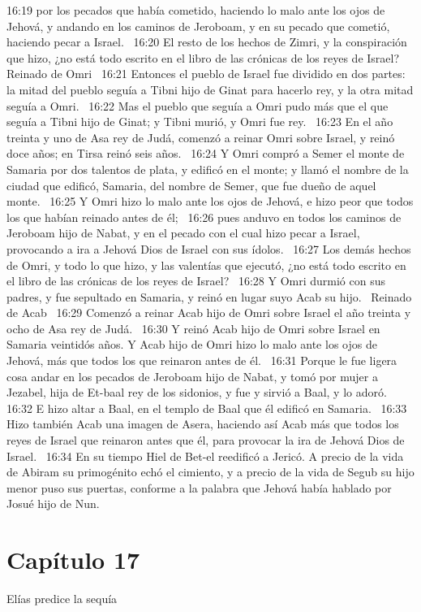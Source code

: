 16:19 por los pecados que había cometido, haciendo lo malo ante los ojos de Jehová, y andando en los caminos de Jeroboam, y en su pecado que cometió, haciendo pecar a Israel.  
16:20 El resto de los hechos de Zimri, y la conspiración que hizo, ¿no está todo escrito en el libro de las crónicas de los reyes de Israel?  
Reinado de Omri  
16:21 Entonces el pueblo de Israel fue dividido en dos partes: la mitad del pueblo seguía a Tibni hijo de Ginat para hacerlo rey, y la otra mitad seguía a Omri.  
16:22 Mas el pueblo que seguía a Omri pudo más que el que seguía a Tibni hijo de Ginat; y Tibni murió, y Omri fue rey.  
16:23 En el año treinta y uno de Asa rey de Judá, comenzó a reinar Omri sobre Israel, y reinó doce años; en Tirsa reinó seis años.  
16:24 Y Omri compró a Semer el monte de Samaria por dos talentos de plata, y edificó en el monte; y llamó el nombre de la ciudad que edificó, Samaria, del nombre de Semer, que fue dueño de aquel monte.  
16:25 Y Omri hizo lo malo ante los ojos de Jehová, e hizo peor que todos los que habían reinado antes de él;  
16:26 pues anduvo en todos los caminos de Jeroboam hijo de Nabat, y en el pecado con el cual hizo pecar a Israel, provocando a ira a Jehová Dios de Israel con sus ídolos.  
16:27 Los demás hechos de Omri, y todo lo que hizo, y las valentías que ejecutó, ¿no está todo escrito en el libro de las crónicas de los reyes de Israel?  
16:28 Y Omri durmió con sus padres, y fue sepultado en Samaria, y reinó en lugar suyo Acab su hijo.  
Reinado de Acab  
16:29 Comenzó a reinar Acab hijo de Omri sobre Israel el año treinta y ocho de Asa rey de Judá.  
16:30 Y reinó Acab hijo de Omri sobre Israel en Samaria veintidós años. Y Acab hijo de Omri hizo lo malo ante los ojos de Jehová, más que todos los que reinaron antes de él.  
16:31 Porque le fue ligera cosa andar en los pecados de Jeroboam hijo de Nabat, y tomó por mujer a Jezabel, hija de Et-baal rey de los sidonios, y fue y sirvió a Baal, y lo adoró.  
16:32 E hizo altar a Baal, en el templo de Baal que él edificó en Samaria.  
16:33 Hizo también Acab una imagen de Asera, haciendo así Acab más que todos los reyes de Israel que reinaron antes que él, para provocar la ira de Jehová Dios de Israel.  
16:34 En su tiempo Hiel de Bet-el reedificó a Jericó. A precio de la vida de Abiram su primogénito echó el cimiento, y a precio de la vida de Segub su hijo menor puso sus puertas, conforme a la palabra que Jehová había hablado por Josué hijo de Nun. 
\section*{Capítulo 17}
Elías predice la sequía  

